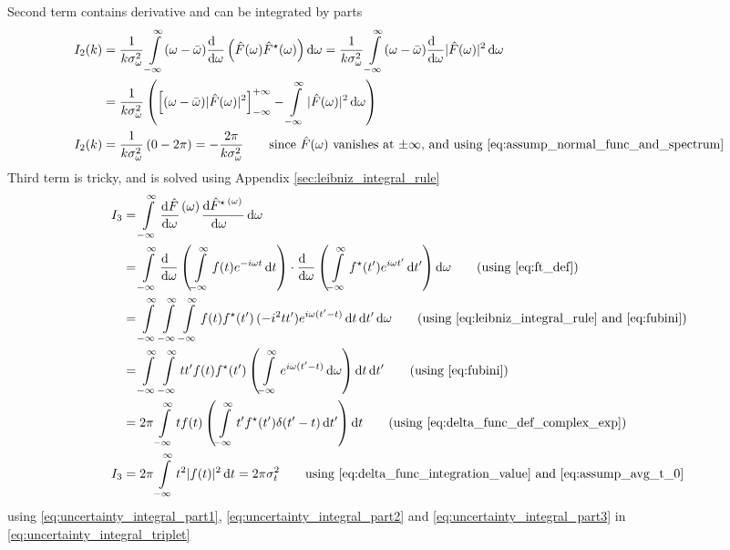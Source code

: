 \documentclass[11pt, a4paper]{article}
\newcommand{\numerator}[1]{\genfrac{}{}{0pt}{}{#1}{}}
\newcommand{\primed}[1]{#1^{\prime}}
\newcommand{\tp}{\primed{t}}	%
\newcommand{\variance}[1]{\sigma_{#1}^{2}}
\newcommand{\diff}{\mathop{}\!\mathrm{d}}
\newcommand{\dt}{\diff t}
\newcommand{\dtp}{\diff \tp}
\newcommand{\domega}{\diff \omega}
\newcommand{\derv}[1]{\frac{\diff \hfill}{\diff #1}}	%
\newcommand{\dervb}[2]{\derv{#1} \left(#2\right)}  %
\newcommand{\dervf}[2]{\frac{\diff #2}{\diff #1 \hfil}}	%
\newcommand{\dint}[2]{\int \limits_{#1}^{#2}}  %
\newcommand{\intinfty}{\dint{-\infty}{\infty}}	%
\newcommand{\iintinfty}{\intinfty \intinfty}	%
\newcommand{\iiintinfty}{\intinfty \intinfty \intinfty}	%
\begin{document}
Second term contains derivative and can be integrated by parts 
\begin{align}
	I_{2}(k) & = \frac{1}{k \variance{\omega}} \intinfty (\omega - \bar{\omega}) \dervb{\omega}{\hat{F}(\omega) \hat{F}^{\star}(\omega)} \domega = \frac{1}{k \variance{\omega}} \intinfty (\omega - \bar{\omega}) \derv{\omega}|\hat{F}(\omega)|^{2} \domega \nonumber \\
	& = \frac{1}{k \variance{\omega}} \left(\left[(\omega - \bar{\omega})|\hat{F}(\omega)|^{2}\right]_{-\infty}^{+\infty} - \intinfty |\hat{F}(\omega)|^{2} \domega \right) \nonumber \\
	I_{2}(k) & = \frac{1}{k \variance{\omega}} \left(0 - 2\pi \right) = -\frac{2\pi}{k \variance{\omega}} \qquad \text{since $\hat{F}(\omega)$ vanishes at $\pm\infty$, and using \eqref{eq:assump_normal_func_and_spectrum}} \label{eq:uncertainty_integral_part2}
\end{align}
Third term is tricky, and is solved using Appendix \ref{sec:leibniz_integral_rule}
\begin{align}
	I_{3} & = \intinfty \dervf{\omega}{\hat{F}}\numerator{(\omega)} \dervf{\omega}{\hat{F}^{\star}\numerator{(\omega)}} \domega \nonumber \\
	& = \intinfty \dervb{\omega}{\intinfty f(t)e^{-i \omega t} \dt} \cdot \dervb{\omega}{\intinfty f^{\star}(\tp)e^{i \omega \tp} \dtp} \domega \nonumber \tag{using \eqref{eq:ft_def}} \\
	& =  \iiintinfty f(t)f^{\star}(\tp)\,(-i^{2}t \tp)e^{i \omega (\tp - t)} \dt \dtp \domega
	\nonumber \tag{using \eqref{eq:leibniz_integral_rule} and \eqref{eq:fubini}} \\
	& = \iintinfty t \tp f(t)f^{\star}(\tp) \left(\intinfty e^{i \omega (\tp - t)} \domega \right) \dt \dtp \nonumber \tag{using \eqref{eq:fubini}} \\
	& = 2 \pi \intinfty t f(t) \left(\intinfty \tp f^{\star}(\tp) \delta(\tp - t) \dtp \right) \dt  \nonumber \tag{using \eqref{eq:delta_func_def_complex_exp}} \\
	I_{3} & = 2 \pi \intinfty t^{2} |f(t)|^{2} \dt = 2 \pi \variance{t}   \qquad \text{using \eqref{eq:delta_func_integration_value} and \eqref{eq:assump_avg_t_0}} \label{eq:uncertainty_integral_part3}
\end{align}
using \eqref{eq:uncertainty_integral_part1}, \eqref{eq:uncertainty_integral_part2} and \eqref{eq:uncertainty_integral_part3} in \eqref{eq:uncertainty_integral_triplet}
\end{document}
